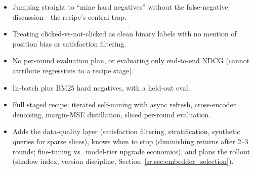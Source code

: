 \begin{interviewq}
\redflags
\begin{itemize}
    \item Jumping straight to ``mine hard negatives'' without the false-negative discussion---the recipe's central trap.
    \item Treating clicked-vs-not-clicked as clean binary labels with no mention of position bias or satisfaction filtering.
    \item No per-round evaluation plan, or evaluating only end-to-end NDCG (cannot attribute regressions to a recipe stage).
\end{itemize}


\goodgreat
\begin{itemize}
    \item {} In-batch plus BM25 hard negatives, with a held-out eval.
    \item {} Full staged recipe: iterated self-mining with async refresh, cross-encoder denoising, margin-MSE distillation, sliced per-round evaluation.
    \item {} Adds the data-quality layer (satisfaction filtering, stratification, synthetic queries for sparse slices), knows when to stop (diminishing returns after 2--3 rounds; fine-tuning vs.\ model-tier upgrade economics), and plans the rollout (shadow index, version discipline, Section~\ref{sr:sec:embedder_selection}).
\end{itemize}

\end{interviewq}


